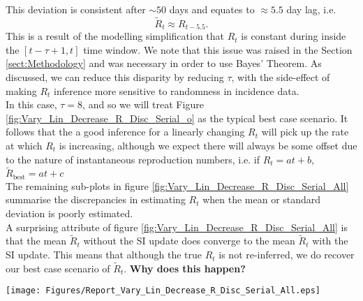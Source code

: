 \documentclass[10pt,journal,compsoc]{IEEEtran}
\begin{document}


This deviation is consistent after $\sim 50$ days and equates to $\approx 5.5$ day lag, i.e.  $$\tilde{R}_t \approx R_{t-5.5}.$$ This is a result of the modelling simplification that $R_t$ is constant during inside the $[t-\tau +1, t]$ time window. We note that this issue was raised in the Section \ref{sect:Methodology} and was necessary in order to use Bayes' Theorem. As discussed, we can reduce this disparity by reducing $\tau$, with the side-effect of making $R_t$ inference more sensitive to randomness in incidence data.\\
In this case, $\tau=8$, and so we will treat Figure \ref{fig:Vary_Lin_Decrease_R_Disc_Serial_o} as the typical best case scenario. It follows that the a good inference for a linearly changing $R_t$ will pick up the rate at which $R_t$ is increasing, although we expect there will always be some offset due to the nature of instantaneous reproduction numbers, i.e. if $R_t = at +b$, $\tilde{R}_{\text{best}} = at+c$ \\

The remaining sub-plots in figure \ref{fig:Vary_Lin_Decrease_R_Disc_Serial_All} summarise the discrepancies in estimating $R_t$ when the mean or standard deviation is poorly estimated.\\
A surprising attribute of figure \ref{fig:Vary_Lin_Decrease_R_Disc_Serial_All} is that the mean $\tilde{R}_t$ without the SI update does converge to the mean $\tilde{R}_t$ with the SI update. This means that although the true $R_t$ is not re-inferred, we do recover our best case scenario of $\tilde{R}_t$. \textbf{Why does this happen?}\\



\begin{figure*}
\centering
\texttt{[image: Figures/Report\_Vary\_Lin\_Decrease\_R\_Disc\_Serial\_All.eps]}
\label{fig:Vary_Lin_Decrease_R_Disc_Serial_All}
\end{figure*}
\end{document}
